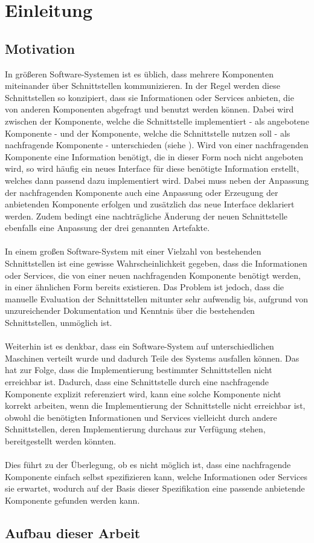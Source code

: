 \chapter{Einleitung}
\section{Motivation}
In größeren Software-Systemen ist es üblich, dass mehrere Komponenten miteinander über Schnittstellen kommunizieren. In der Regel werden diese Schnittstellen so konzipiert, dass sie Informationen oder Services anbieten, die von anderen Komponenten abgefragt und benutzt werden können. Dabei wird zwischen der Komponente, welche die Schnittstelle implementiert - als angebotene Komponente - und der Komponente, welche die Schnittstelle nutzen soll - als nachfragende Komponente - unterschieden (siehe ). 
\noindent
Wird von einer nachfragenden Komponente eine Information benötigt, die in dieser Form noch nicht angeboten wird, so wird häufig ein neues Interface für diese benötigte Information erstellt, welches dann passend dazu implementiert wird. Dabei muss neben der Anpassung der nachfragenden Komponente auch eine Anpassung oder Erzeugung der anbietenden Komponente erfolgen und zusätzlich das neue Interface deklariert werden. Zudem bedingt eine nachträgliche Änderung der neuen Schnittstelle ebenfalls eine Anpassung der drei genannten Artefakte.\\\\
In einem großen Software-System mit einer Vielzahl von bestehenden Schnittstellen ist eine gewisse Wahrscheinlichkeit gegeben, dass die Informationen oder Services, die von einer neuen nachfragenden Komponente benötigt werden, in einer ähnlichen Form bereits existieren. Das Problem ist jedoch, dass die manuelle Evaluation der Schnittstellen mitunter sehr aufwendig bis, aufgrund von unzureichender Dokumentation und Kenntnis über die bestehenden Schnittstellen, unmöglich ist.\\\\
Weiterhin ist es denkbar, dass ein Software-System auf unterschiedlichen Maschinen verteilt wurde und dadurch Teile des Systems ausfallen können. Das hat zur Folge, dass die Implementierung bestimmter Schnittstellen nicht erreichbar ist. Dadurch, dass eine Schnittstelle durch eine nachfragende Komponente explizit referenziert wird, kann eine solche Komponente nicht korrekt arbeiten, wenn die Implementierung der Schnittstelle nicht erreichbar ist, obwohl die benötigten Informationen und Services vielleicht durch andere Schnittstellen, deren Implementierung durchaus zur Verfügung stehen, bereitgestellt werden könnten.\\\\
Dies führt zu der Überlegung, ob es nicht möglich ist, dass eine nachfragende Komponente einfach selbst spezifizieren kann, welche Informationen oder Services sie erwartet, wodurch auf der Basis dieser Spezifikation eine passende anbietende Komponente gefunden werden kann.

\section{Aufbau dieser Arbeit}
%
